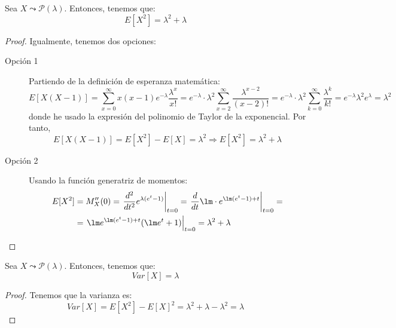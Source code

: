 \begin{lema}
    Sea $X\leadsto \mathcal{P}(\lambda)$. Entonces, tenemos que:
    \begin{equation*}
        E[X^2]= \lambda^2+\lambda
    \end{equation*}
\end{lema}
\begin{proof} 
    Igualmente, tenemos dos opciones:
    \begin{description}
        \item[Opción 1]  Partiendo de la definición de esperanza matemática:
        \begin{equation*}
            E[X(X-1)]=\sum_{x=0}^\infty x(x-1)e^{-\lambda}\frac{\lambda^x}{x!}
            = e^{-\lambda}\cdot \lambda^2 \sum_{x=2}^\infty \frac{\lambda^{x-2}}{(x-2)!}
            = e^{-\lambda}\cdot \lambda^2 \sum_{k=0}^\infty \frac{\lambda^k}{k!} = e^{-\lambda}\lambda^2 e^{\lambda}=\lambda^2
        \end{equation*}
        donde he usado la expresión del polinomio de Taylor de la exponencial. Por tanto,
        \begin{equation*}
            E[X(X-1)]=E[X^2]-E[X]=\lambda^2 \Longrightarrow E[X^2]=\lambda^2 +\lambda
        \end{equation*}

        \item [Opción 2] Usando la función generatriz de momentos:
        \begin{align*}
            E[X^2]&=M_X''(0)=\left. \frac{d^2}{dt^2} e^{\lambda(e^t-1)}\right|_{t=0} = \left. \dfrac{d}{dt} \lm \cdot e^{\lm (e^t-1) +t}\right|_{t=0} =\\&= \left.\lm e^{\lm(e^t-1)+t}(\lm e^t+1)\right|_{t=0} = \lambda^2+\lambda
        \end{align*}
    \end{description}
\end{proof}

\begin{coro}
    Sea $X\leadsto \mathcal{P}(\lambda)$. Entonces, tenemos que:
    \begin{equation*}
        Var[X]= \lambda
    \end{equation*}
\end{coro}
\begin{proof} Tenemos que la varianza es:
    \begin{equation*}
        Var[X]=E[X^2]-E[X]^2 = \lambda^2+\lambda-\lambda^2=\lambda
    \end{equation*}
\end{proof}



